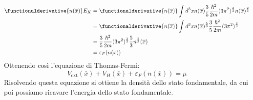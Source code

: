 \begin{equation*}
    \begin{aligned}
        \functionalderivative{n(\overline x)}E_{K}
        & =\functionalderivative{n(\overline x)}\int d^3x n(\overline x)\frac 35 \frac{\hbar^2}{2m}(3\pi^2)^{\frac 23}n(\overline x)^{\frac 23} \\
        & = \functionalderivative{n(\overline x)}\int d^3x n(\overline x)^{\frac 53}\frac 35 \frac{\hbar^2}{2m}(3\pi^2)^{\frac 23} \\
        & = \frac 35\frac{\hbar^2}{2m}(3\pi^2)^{\frac 23}\frac 53n^{\frac 23}(\overline x)\\
        & = \varepsilon_F(n(\overline x))
    \end{aligned}
\end{equation*}
Ottenendo così l'equazione di Thomas-Fermi:
\begin{equation*}
    V_{\text {ext}}(\overline x)+V_H(\overline x) + \varepsilon_F(n(\overline x))=\mu
\end{equation*}
Risolvendo questa equazione si ottiene la densità dello stato fondamentale, da cui poi possiamo ricavare l'energia dello stato fondamentale.


